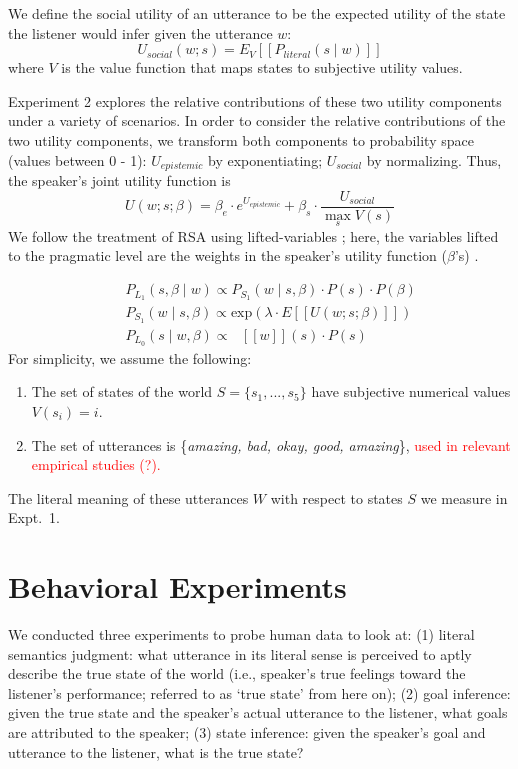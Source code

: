 \documentclass[10pt,letterpaper]{article}
\newcommand{\denote}[1]{\mbox{ $[\![ #1 ]\!]$}}
\newcommand{\red}[1]{\textcolor{Red}{#1}}
\begin{document}
We define the social utility of an utterance to be the expected utility of the state the listener would infer given the utterance $w$: 
%
$$
U_{social}(w; s) = E_{V}[[P_{literal}(s \mid w)]]
$$
%
where $V$ is the value function that maps states to subjective utility values. 

Experiment 2 explores the relative contributions of these two utility components under a variety of scenarios. 
In order to consider the relative contributions of the two utility components, we transform both components to probability space (values between 0 - 1): $U_{epistemic}$ by exponentiating; $U_{social}$ by normalizing. Thus, the speaker's joint utility function is
%
$$
U(w;s; \beta) = \beta_{e}\cdot e^{U_{epistemic}} + \beta_{s} \cdot \frac{U_{social}}{\max_{s} V(s)}
$$
%
We follow the treatment of RSA using lifted-variables \cite{GoodmanLassiter2015, Kao2014, Degen2015}; here, the variables lifted to the pragmatic level are the weights in the speaker's utility function ($\beta$'s) .

%
\begin{eqnarray}
&&P_{L_1}(s, \beta \mid w)\propto P_{S_1}(w \mid s, \beta)\cdot P(s) \cdot P(\beta) \label{eq:L1}\\
&&P_{S_1}(w \mid s, \beta) \propto \mathrm{exp}(\lambda \cdot E[[U(w; s; \beta)]])\label{eq:S1}\\
&&P_{L_0}(s \mid w, \beta)\propto \denote{w}(s) \cdot P(s) \label{eq:L0}
\end{eqnarray}
%
For simplicity, we assume the following:
\begin{enumerate}
\item The set of states of the world $S = \{s_{1}, ...,  s_{5}\}$ have subjective numerical values $V(s_{i}) = i$. 
\item The set of utterances is \{\emph{amazing, bad, okay, good, amazing}\},
  \red{used in relevant empirical studies \cite{Bonnefon} (?).}\end{enumerate}
The literal meaning of these utterances $W$ with respect to states $S$ we measure in Expt.~1. 



\section{Behavioral Experiments}

We conducted three experiments to probe human data to look at: (1) literal semantics judgment: what utterance in its literal sense is perceived to aptly describe the true state of the world (i.e., speaker's true feelings toward the listener's performance; referred to as `true state' from here on); (2) goal inference: given the true state and the speaker's actual utterance to the listener, what goals are attributed to the speaker; (3) state inference: given the speaker's goal and utterance to the listener, what is the true state?
\end{document}
